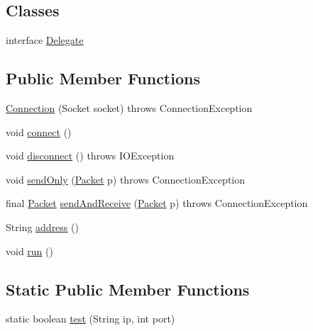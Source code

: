 \subsection*{Classes}
\begin{DoxyCompactItemize}
\item 
interface \hyperlink{interfacept_1_1up_1_1fe_1_1lpro1613_1_1sharedlib_1_1conn_1_1_connection_1_1_delegate}{Delegate}
\end{DoxyCompactItemize}
\subsection*{Public Member Functions}
\begin{DoxyCompactItemize}
\item 
\hyperlink{classpt_1_1up_1_1fe_1_1lpro1613_1_1sharedlib_1_1conn_1_1_connection_ad3c3b594a0c16b3b95f504039700a876}{Connection} (Socket socket)  throws Connection\+Exception 
\item 
void \hyperlink{classpt_1_1up_1_1fe_1_1lpro1613_1_1sharedlib_1_1conn_1_1_connection_a8ccfed3defecf3a4070c32a0f3d6acb7}{connect} ()
\item 
void \hyperlink{classpt_1_1up_1_1fe_1_1lpro1613_1_1sharedlib_1_1conn_1_1_connection_a3f57700e6cf5cb4ae80ce06db37ab0fc}{disconnect} ()  throws I\+O\+Exception 
\item 
void \hyperlink{classpt_1_1up_1_1fe_1_1lpro1613_1_1sharedlib_1_1conn_1_1_connection_acdcf8af7c9a37ede122c6db80d06668f}{send\+Only} (\hyperlink{classpt_1_1up_1_1fe_1_1lpro1613_1_1sharedlib_1_1conn_1_1_packet}{Packet} p)  throws Connection\+Exception 
\item 
final \hyperlink{classpt_1_1up_1_1fe_1_1lpro1613_1_1sharedlib_1_1conn_1_1_packet}{Packet} \hyperlink{classpt_1_1up_1_1fe_1_1lpro1613_1_1sharedlib_1_1conn_1_1_connection_ac70216d1f9f5ed2c8b29431b10108620}{send\+And\+Receive} (\hyperlink{classpt_1_1up_1_1fe_1_1lpro1613_1_1sharedlib_1_1conn_1_1_packet}{Packet} p)  throws Connection\+Exception 
\item 
String \hyperlink{classpt_1_1up_1_1fe_1_1lpro1613_1_1sharedlib_1_1conn_1_1_connection_a58903a343693acbe946d4ad23eb29bd4}{address} ()
\item 
void \hyperlink{classpt_1_1up_1_1fe_1_1lpro1613_1_1sharedlib_1_1conn_1_1_connection_ad2971acbca89cf81dcb5fe0ece0a53c4}{run} ()
\end{DoxyCompactItemize}
\subsection*{Static Public Member Functions}
\begin{DoxyCompactItemize}
\item 
static boolean \hyperlink{classpt_1_1up_1_1fe_1_1lpro1613_1_1sharedlib_1_1conn_1_1_connection_a9431e4e6dd9b16f463bd75079bd8c371}{test} (String ip, int port)
\end{DoxyCompactItemize}
